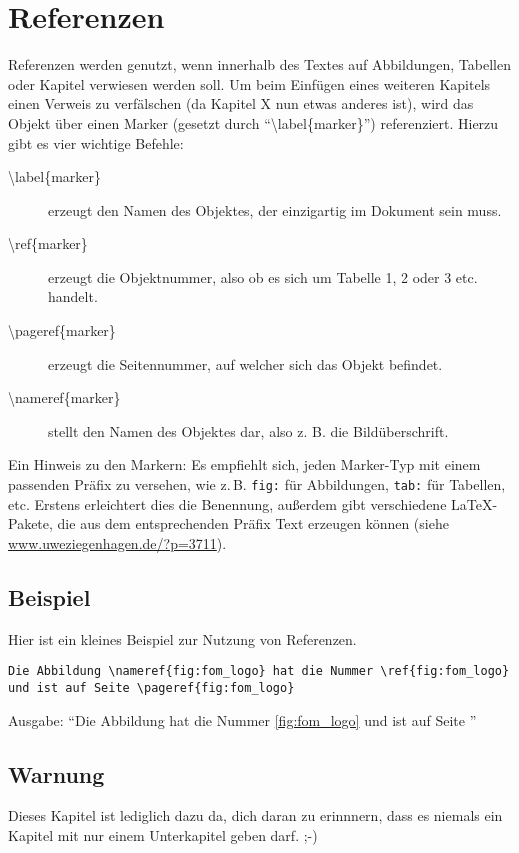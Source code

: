 
\chapter{Referenzen}\label{ch:referenzen}

Referenzen werden genutzt, wenn innerhalb des Textes auf Abbildungen, Tabellen oder Kapitel verwiesen werden soll. 
Um beim Einfügen eines weiteren Kapitels einen Verweis zu verfälschen (da Kapitel X nun etwas anderes ist), wird das Objekt über einen Marker (gesetzt durch \enquote{\textbackslash label\{marker\}}) referenziert. 
Hierzu gibt es vier wichtige Befehle:

\begin{description}
\item[{\textbackslash label\{marker\}}] erzeugt den Namen des Objektes, der einzigartig im Dokument sein muss.
\item[{\textbackslash ref\{marker\}}] erzeugt die Objektnummer, also ob es sich um Tabelle 1, 2 oder 3 etc. handelt.
\item[{\textbackslash pageref\{marker\}}] erzeugt die Seitennummer, auf welcher sich das Objekt befindet.
\item[{\textbackslash nameref\{marker\}}] stellt den Namen des Objektes dar, also z. B. die Bildüberschrift.
\end{description}

Ein Hinweis zu den Markern: Es empfiehlt sich, jeden Marker-Typ mit einem passenden Präfix zu versehen, wie z.\,B. \texttt{fig:} für Abbildungen, \texttt{tab:} für Tabellen, etc. Erstens erleichtert dies die Benennung, außerdem gibt verschiedene \LaTeX-Pakete, die aus dem entsprechenden Präfix Text erzeugen können (siehe \url{www.uweziegenhagen.de/?p=3711}).

\section{Beispiel}
Hier ist ein kleines Beispiel zur Nutzung von Referenzen.

\begin{lstlisting}
Die Abbildung \nameref{fig:fom_logo} hat die Nummer \ref{fig:fom_logo} und ist auf Seite \pageref{fig:fom_logo}
\end{lstlisting}
Ausgabe: \enquote{Die Abbildung  hat die Nummer \ref{fig:fom_logo} und ist auf Seite \pageref{fig:fom_logo}}

\section{Warnung}

Dieses Kapitel ist lediglich dazu da, dich daran zu erinnnern, dass es niemals ein Kapitel mit nur einem Unterkapitel geben darf. ;-)